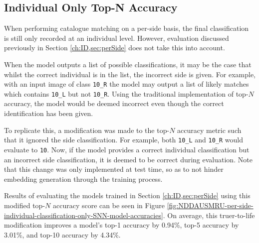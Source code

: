 \subsection{Individual Only Top-N Accuracy}\label{ch:ID,sec:perSide,sub:individualOnlyTopN}

When performing catalogue matching on a per-side basis, the final classification is still only recorded at an individual level. However, evaluation discussed previously in Section \ref{ch:ID,sec:perSide} does not take this into account. 

When the model outputs a list of possible classifications, it may be the case that whilst the correct individual is in the list, the incorrect side is given. For example, with an input image of class \texttt{10\_R} the model may output a list of likely matches which contains \texttt{10\_L} but not \texttt{10\_R}. Using the traditional implementation of top-$N$ accuracy, the model would be deemed incorrect even though the correct identification has been given. 

To replicate this, a modification was made to the top-$N$ accuracy metric such that it ignored the side classification. For example, both \texttt{10\_L} and \texttt{10\_R} would evaluate to \texttt{10}. Now, if the model provides a correct individual classification but an incorrect side classification, it is deemed to be correct during evaluation. Note that this change was only implemented at test time, so as to not hinder embedding generation through the training process. 

Results of evaluating the models trained in Section \ref{ch:ID,sec:perSide} using this modified top-$N$ accuracy score can be seen in Figure \ref{fig:NDDAUSMRU-per-side-individual-classification-only-SNN-model-accuracies}. On average, this truer-to-life modification improves a model's top-1 accuracy by 0.94\%, top-5 accuracy by 3.01\%, and top-10 accuracy by 4.34\%.

